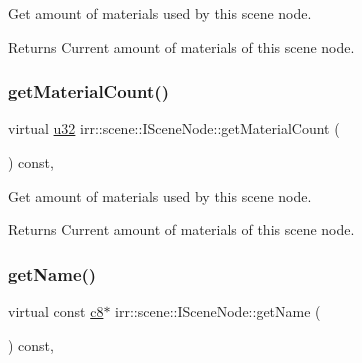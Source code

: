 Get amount of materials used by this scene node. 

\begin{DoxyReturn}{Returns}
Current amount of materials of this scene node. 
\end{DoxyReturn}
\mbox{\label{classirr_1_1scene_1_1ISceneNode_a8e75e9baede63e31e6aa6e42e6c8ddfe}} 
\subsubsection{\texorpdfstring{get\+Material\+Count()}{getMaterialCount()}\hspace{0.1cm}{\footnotesize\ttfamily [2/2]}}
{\footnotesize\ttfamily virtual \hyperlink{namespaceirr_a0416a53257075833e7002efd0a18e804}{u32} irr\+::scene\+::\+I\+Scene\+Node\+::get\+Material\+Count (\begin{DoxyParamCaption}{ }\end{DoxyParamCaption}) const\hspace{0.3cm}{\ttfamily [inline]}, {\ttfamily [virtual]}}



Get amount of materials used by this scene node. 

\begin{DoxyReturn}{Returns}
Current amount of materials of this scene node. 
\end{DoxyReturn}
\mbox{\label{classirr_1_1scene_1_1ISceneNode_ab0e72b38949f926a1929468cd2b1ce16}} 
\subsubsection{\texorpdfstring{get\+Name()}{getName()}\hspace{0.1cm}{\footnotesize\ttfamily [1/2]}}
{\footnotesize\ttfamily virtual const \hyperlink{namespaceirr_a9395eaea339bcb546b319e9c96bf7410}{c8}$\ast$ irr\+::scene\+::\+I\+Scene\+Node\+::get\+Name (\begin{DoxyParamCaption}{ }\end{DoxyParamCaption}) const\hspace{0.3cm}{\ttfamily [inline]}, {\ttfamily [virtual]}}



